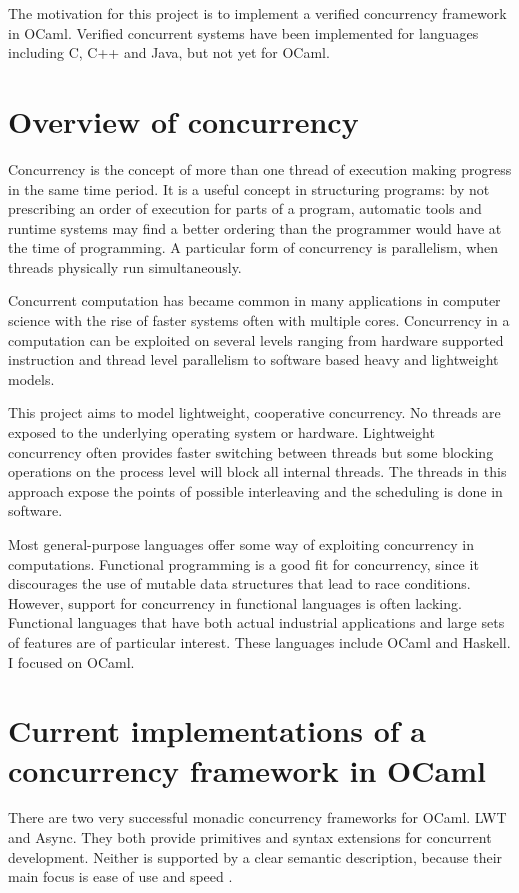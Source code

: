 \documentclass[12pt,twoside,notitlepage]{report}
\theoremstyle{plain}%
\theoremstyle{definition}
\theoremstyle{remark}
\begin{document}
The motivation for this project is to implement a verified concurrency framework in OCaml. Verified concurrent systems have been implemented for languages including C\cite{sevvcik2011relaxed}, C++ and Java\cite{lochbihler2012machine}, but not yet for OCaml. 

\section{Overview of concurrency}
Concurrency is the concept of more than one thread of execution making progress in the same time period. It is a useful concept in structuring programs: by not prescribing an order of execution for parts of a program, automatic tools and runtime systems may find a better ordering than the programmer would have at the time of programming. A particular form of concurrency is parallelism, when threads physically run simultaneously.

Concurrent computation has became common in many applications in computer science with the rise of faster systems often with multiple cores. Concurrency in a computation can be exploited on several levels ranging from hardware supported instruction and thread level parallelism to software based heavy and lightweight models. 

This project aims to model lightweight, cooperative concurrency. No threads are exposed to the underlying operating system or hardware. Lightweight concurrency often provides faster switching between threads  but some blocking operations on the process level will block all internal threads. The threads in this approach expose the points of possible interleaving and the scheduling is done in software.

Most general-purpose languages offer some way of exploiting concurrency in computations. Functional programming is a good fit for concurrency, since it discourages the use of mutable data structures that lead to race conditions.  However, support for concurrency in functional languages is often lacking. Functional languages that have both actual industrial applications and large sets of features are of particular interest. These languages include OCaml and Haskell. I focused on OCaml. 
 

\section{Current implementations of a concurrency framework in OCaml}
There are two very successful monadic concurrency frameworks for OCaml. LWT\cite{LWT} and Async\cite{Async}. They both provide primitives and syntax extensions for concurrent development. Neither is supported by a clear semantic description, because their main focus is ease of use and speed . 
\end{document}
